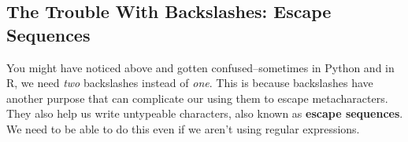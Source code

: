 \documentclass[
  12pt,
  krantz2]{krantz}
\makeatletter
\newenvironment{Shaded}{\begin{snugshade}}{\end{snugshade}}
\newcommand{\AttributeTok}[1]{\textcolor[rgb]{0.61,0.61,0.61}{#1}}
\newcommand{\BuiltInTok}[1]{#1}
\newcommand{\CommentTok}[1]{\textcolor[rgb]{0.37,0.37,0.37}{\textit{#1}}}
\newcommand{\ConstantTok}[1]{\textcolor[rgb]{0,0,0}{#1}}
\newcommand{\DocumentationTok}[1]{\textcolor[rgb]{0.37,0.37,0.37}{\textbf{\textit{#1}}}}
\newcommand{\FunctionTok}[1]{\textcolor[rgb]{0,0,0}{#1}}
\newcommand{\NormalTok}[1]{#1}
\newcommand{\OperatorTok}[1]{\textcolor[rgb]{0.43,0.43,0.43}{\textbf{#1}}}
\newcommand{\SpecialCharTok}[1]{\textcolor[rgb]{0,0,0}{#1}}
\newcommand{\StringTok}[1]{\textcolor[rgb]{0.5,0.5,0.5}{#1}}
\newcommand{\VariableTok}[1]{\textcolor[rgb]{0,0,0}{#1}}
\newenvironment{kframe}{%
\medskip{}
\setlength{\fboxsep}{.8em}
 \def\at@end@of@kframe{}%
 \ifinner\ifhmode%
  \def\at@end@of@kframe{\end{minipage}}%
  \begin{minipage}{\columnwidth}%
 \fi\fi%
 \def\FrameCommand##1{\hskip\@totalleftmargin \hskip-\fboxsep
 \colorbox{shadecolor}{##1}\hskip-\fboxsep
     \hskip-\linewidth \hskip-\@totalleftmargin \hskip\columnwidth}%
 \MakeFramed {\advance\hsize-\width
   \@totalleftmargin\z@ \linewidth\hsize
   \@setminipage}}%
 {\par\unskip\endMakeFramed%
 \at@end@of@kframe}
\renewenvironment{Shaded}{\begin{kframe}}{\end{kframe}}
\makeatother
\begin{document}
\begin{Shaded}
\end{Shaded}

\begin{Shaded}
\end{Shaded}

\hypertarget{the-trouble-with-backslashes-escape-sequences}{%
\subsection{The Trouble With Backslashes: Escape Sequences}\label{the-trouble-with-backslashes-escape-sequences}}

You might have noticed above and gotten confused--sometimes in Python and in R, we need \emph{two} backslashes instead of \emph{one}. This is because backslashes have another purpose that can complicate our using them to escape metacharacters. They also help us write untypeable characters, also known as \textbf{escape sequences}. We need to be able to do this even if we aren't using regular expressions.
\end{document}
